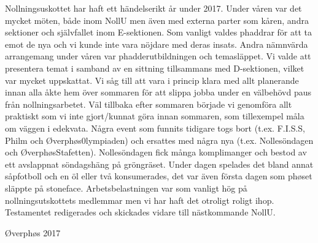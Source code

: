 \documentclass[../_main/handlingar.tex]{subfiles}
\begin{document}
Nollningsuskottet har haft ett händelserikt år under 2017. Under våren var det mycket möten, både inom NollU men även med externa parter som kåren, andra sektioner och självfallet inom E-sektionen. Som vanligt valdes phaddrar för att ta emot de nya och vi kunde inte vara nöjdare med deras insats. 
Andra nämnvärda arrangemang under våren var phadderutbildningen och temasläppet. Vi valde att presentera temat i samband av en sittning tillsammans med D-sektionen, vilket var mycket uppskattat. 
Vi såg till att vara i princip klara med allt planerande innan alla åkte hem över sommaren för att slippa jobba under en välbehövd paus från nollningsarbetet. Väl tillbaka efter sommaren började vi genomföra allt praktiskt som vi inte gjort/kunnat göra innan sommaren, som tillexempel måla om väggen i edekvata. 
Några event som funnits tidigare togs bort (t.ex. F.I.S.S, Philm och Øverphøs0lympiaden) och ersattes med några nya (t.ex. Nollesöndagen och ØverphøsStafetten).  Nollesöndagen fick många komplimanger och bestod av ett avslappnat söndagshäng på gröngräset. Under dagen spelades det bland annat såpfotboll och en öl eller två konsumerades, det var även första dagen som phøset släppte på stoneface. 
Arbetsbelastningen var som vanligt hög på nollningsutskottets medlemmar men vi har haft det otroligt roligt ihop. Testamentet redigerades och skickades vidare till nästkommande NollU.

\begin{signatures}{1}
    \mvh
    \signature{Niklas Gustafson}{Øverphøs 2017}
\end{signatures}
\end{document}
